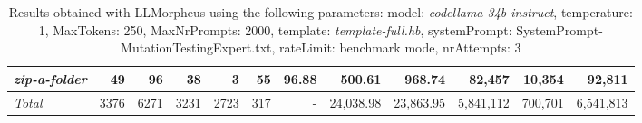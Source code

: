 \begin{table*}
{\begin{tabular}{l||r|r|r|r|r|r||r|r||r|r|r}
   \hline
   \textit{zip-a-folder} & 49 & 96 & 38 & 3 & 55 & 96.88 & 500.61 & 968.74 & 82,457 & 10,354 & 92,811 \\ 
   \hline
   \textit{Total} & 3376 & 6271 & 3231 & 2723 & 317 & - & 24,038.98  & 23,863.95 & 5,841,112 & 700,701 & 6,541,813 \\ 
 \end{tabular}
 }
 \caption{Results obtained with LLMorpheus using the following parameters: 
   model: \textit{codellama-34b-instruct}, 
   temperature: 1, 
   MaxTokens: 250, 
   MaxNrPrompts: 2000, 
   template: \textit{template-full.hb}, 
   systemPrompt: SystemPrompt-MutationTestingExpert.txt, 
   rateLimit: benchmark mode, 
   nrAttempts: 3  
 }
\end{table*}

